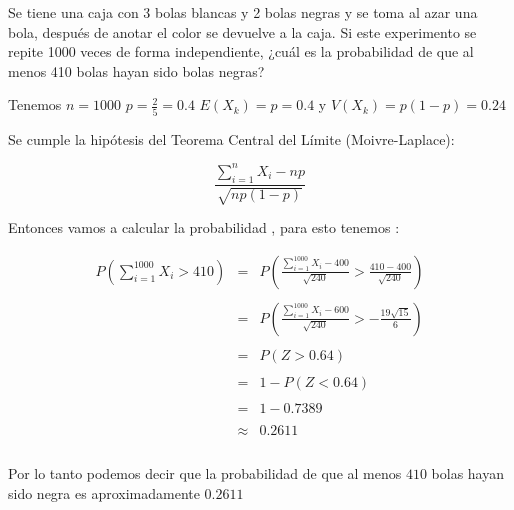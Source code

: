 \documentclass[10pt]{article}
\begin{document}
	\begin{flushleft}
		Se tiene una caja con 3 bolas blancas y 2 bolas negras y se toma al azar una bola, despu\'es de anotar el color se devuelve a la caja. Si este experimento se repite 1000 veces de forma independiente, ¿cu\'al es la probabilidad de que al menos 410 bolas hayan sido bolas negras?
	\end{flushleft}

	\begin{flushleft}
		Tenemos $n=1000$ $p=\frac{2}{5}=0.4$ $E(X_k) = p=0.4$ y $V (X_k) = p(1- p)=0.24$
	\end{flushleft}
	
	\begin{flushleft}
		Se cumple la hip\'otesis del Teorema Central del L\'imite (Moivre-Laplace):
	\end{flushleft}


	\begin{equation*}
		\frac{\sum_{i=1}^{n}X_i-np}{\sqrt{np(1-p)}}
	\end{equation*}


	\begin{flushleft}
		Entonces vamos a calcular la probabilidad , para esto tenemos : 
	\end{flushleft}
	
	\begin{equation*}
		\begin{array}{rcl}
			P(\sum_{i=1}^{1000}X_i > 410)  	& = &P(\frac{\sum_{i=1}^{1000}X_i-400}{\sqrt{240}}> \frac{410-400}{\sqrt{240}})
			\\
			\\
											& = & P(\frac{\sum_{i=1}^{1000}X_i-600}{\sqrt{240}}> -\frac{19\sqrt{15}}{6})
			\\
			\\
											& = &P(Z>0.64)
			\\
			\\
											& = & 1-P(Z<0.64)
			\\
			\\
	                                         & = & 1-0.7389
			\\
			\\
											 &\approx &  0.2611
			\\
			\\
		\end{array}
	\end{equation*}

	\begin{flushleft}
		Por lo tanto podemos decir que la probabilidad de que al menos $410$ bolas hayan sido negra es aproximadamente  $0.2611$
	\end{flushleft}

	
\end{document}
